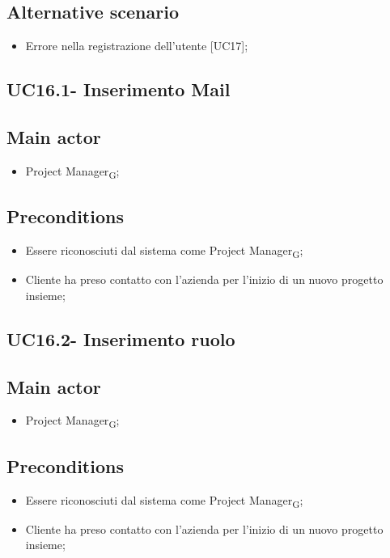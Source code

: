 \documentclass{article}
\begin{document}
    \subsection*{Alternative scenario}
        \begin{itemize}
            \item Errore nella registrazione dell'utente [UC17];
        \end{itemize}

    \subsection{UC16.1- Inserimento Mail}
    \subsection*{Main actor}
        \begin{itemize}
            \item Project Manager\textsubscript{G};
        \end{itemize}
        
    \subsection*{Preconditions}
        \begin{itemize}
            \item Essere riconosciuti dal sistema come Project Manager\textsubscript{G};
            \item Cliente ha preso contatto con l'azienda per l'inizio di un nuovo progetto insieme;
        \end{itemize}
        

    \subsection{UC16.2- Inserimento ruolo}
    \subsection*{Main actor}
        \begin{itemize}
            \item Project Manager\textsubscript{G};
        \end{itemize}
        
    \subsection*{Preconditions}
        \begin{itemize}
            \item Essere riconosciuti dal sistema come Project Manager\textsubscript{G};
            \item Cliente ha preso contatto con l'azienda per l'inizio di un nuovo progetto insieme;
        \end{itemize}
        
\end{document}
